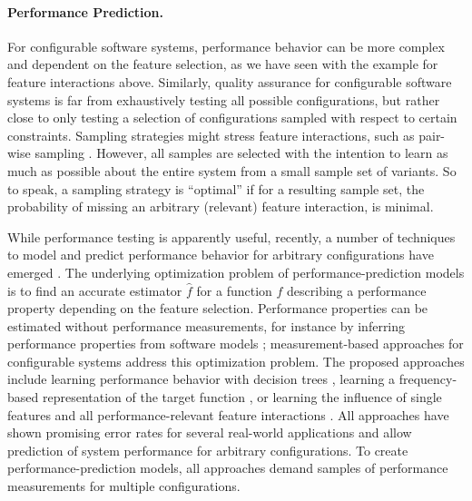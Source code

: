 \paragraph{Performance Prediction.}
For configurable software systems, performance behavior can be more complex and
dependent on the feature selection, as we have seen with the example for
feature interactions above. Similarly, quality assurance for configurable
software systems is far from exhaustively testing all possible configurations,
but rather close to only testing a selection of configurations sampled with
respect to certain constraints. Sampling strategies might stress feature
interactions, such as pair-wise sampling \citep{siegmund_predicting_2012}.
However, all samples are selected with the intention to learn as much as
possible about the entire system from a small sample set of variants. So to
speak, a sampling strategy is ``optimal'' if for a resulting sample set, the
probability of missing an arbitrary (relevant) feature interaction, is minimal.

While performance testing is apparently useful, recently, a number of techniques
to model and predict performance behavior for arbitrary configurations have
emerged
\citep{siegmund_predicting_2012,siegmund_performance-influence_2015,guo_variability-aware_2013,sarkar_cost-efficient_2015}.
The underlying optimization problem of performance-prediction models is to find an accurate estimator $\hat{f}$ for a function $f$ describing a performance
property depending on the feature selection. Performance properties can be
estimated without performance measurements, for instance by inferring
performance properties from software models \citep{woodside_future_2007};
measurement-based approaches for configurable systems address this optimization
problem.  The proposed approaches include learning performance behavior with decision trees
\citep{guo_variability-aware_2013,sarkar_cost-efficient_2015}, learning a frequency-based representation
of the target function \citep{zhang_performance_2015}, or learning the
influence of single features and all performance-relevant feature interactions
\citep{siegmund_predicting_2012,siegmund_performance-influence_2015}. All
approaches have shown promising error rates for several real-world applications
and allow prediction of system performance for arbitrary configurations.
To create performance-prediction models, all approaches demand samples of
performance measurements for multiple configurations.

